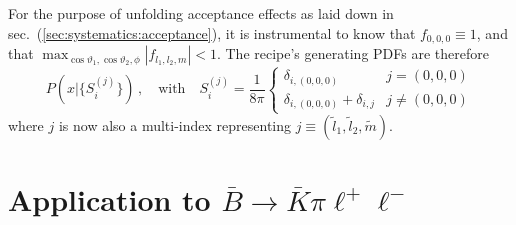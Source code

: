 \documentclass[aps,prd,reprint,nofootinbib,preprintnumbers]{revtex4}
\newcommand{\refsec}[1]{sec.~(\ref{sec:#1})}
\renewcommand{\theta}{\vartheta}
\begin{document}
For the purpose of unfolding acceptance effects as laid down in \refsec{systematics:acceptance}, it is instrumental
to know that $f_{0,0,0} \equiv 1$, and that $\max_{\cos\theta_1,\cos\theta_2,\phi} |f_{l_1, l_2, m}| < 1$.
The recipe's generating PDFs are therefore
\begin{equation}
    \label{eq:recipe:lambdabtolambdall}
    P(x|\lbrace S_i^{(j)}\rbrace)\,,\quad\text{with}\quad S_i^{(j)} = \frac{1}{8\pi}
        \begin{cases}
            \delta_{i,(0,0,0)}                  & j = (0, 0, 0)\\
            \delta_{i,(0,0,0)}  + \delta_{i,j}  & j \neq (0, 0, 0)
        \end{cases}
\end{equation}
where $j$ is now also a multi-index representing $j \equiv (\tilde l_1, \tilde l_2, \tilde m)$.

\section{Application to $\bar{B}\to\bar{K}\pi\ell^+\ell^-$}
\label{app:btokstarll}
\end{document}
